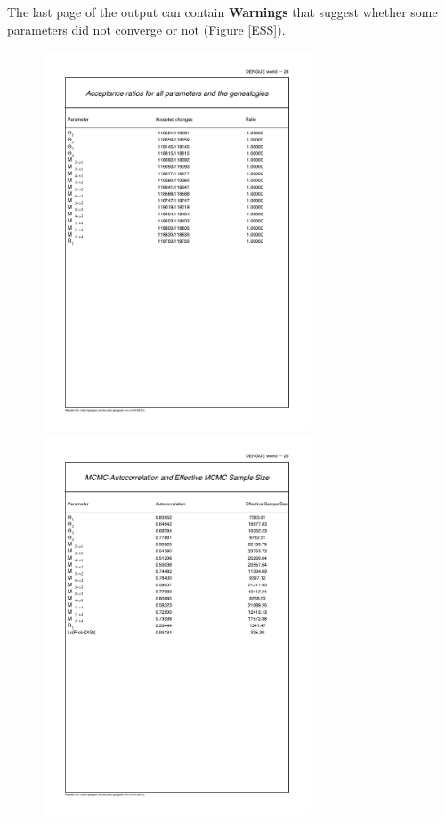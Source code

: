 The last page of the output can contain  {\bf Warnings} that suggest whether some parameters did not converge or not (Figure \ref{ESS}). 
\begin{figure}[bh]
\begin{center}
\includegraphics[width=8cm]{mim/acceptance}
\includegraphics[width=8cm]{mim/ess}

\end{center}
\end{figure}
